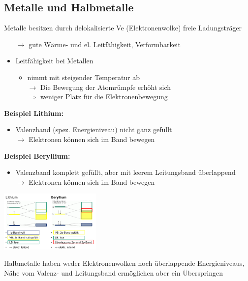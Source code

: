 \subsection{Metalle und Halbmetalle}
    Metalle besitzen durch delokalisierte Ve (Elektronenwolke) freie Ladungsträger 
    \begin{itemize}
        \item[$\rightarrow$] gute Wärme- und el. Leitfähigkeit, Verformbarkeit
        \item Leitfähigkeit bei Metallen
        \begin{itemize}
            \item nimmt mit steigender Temperatur ab\\$\rightarrow$ Die Bewegung der Atomrümpfe erhöht sich\\$\Rightarrow$ weniger Platz für die Elektronenbewegung
        \end{itemize}
    \end{itemize}
    \begin{minipage}{0.48\columnwidth}
        \textbf{Beispiel Lithium:}
            \begin{itemize}
                \item Valenzband (spez. Energieniveau) nicht ganz gefüllt\\$\rightarrow$ Elektronen können sich im Band bewegen
            \end{itemize}
    \end{minipage}
    \hfill
    \begin{minipage}{0.48\columnwidth}
        \textbf{Beispiel Beryllium:}
            \begin{itemize}
                \item Valenzband komplett gefüllt, aber mit leerem Leitungsband überlappend\\$\rightarrow$ Elektronen können sich im Band bewegen
            \end{itemize} 
    \end{minipage}
    \begin{center}
        \includegraphics[height=3cm]{pictures/Baender.png}
    \end{center}
    Halbmetalle haben weder Elektronenwolken noch überlappende Energieniveaus, Nähe vom Valenz- und Leitungsband ermöglichen aber ein Überspringen
